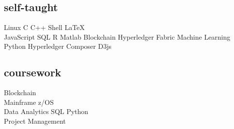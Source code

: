 \documentclass[]{deedy-resume-openfont}
\def\tb{\textbullet}
\begin{document}
\begin{minipage}[t]{0.33\textwidth}
\subsection{self-taught}
 Linux \tb{}
C \tb{} C++ \tb{} Shell \tb{} \LaTeX\ \\
  JavaScript \tb{} SQL \tb{} R \tb{} Matlab \tb{}
Blockchain \tb{} Hyperledger Fabric \tb{} Machine Learning \tb{} Python \tb{}
 Hyperledger Composer
 \tb{} D3js \\ 
\sectionsep

\subsection{coursework}
Blockchain \\
Mainframe \tb{} z/OS \\
Data Analytics \tb{} SQL \tb{} Python \\
Project Management

%
%

\end{minipage} 
\hfill
\end{document}
